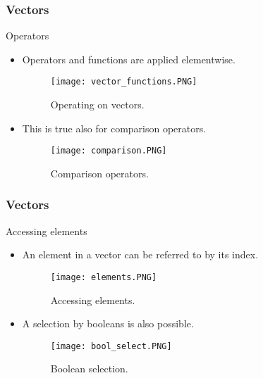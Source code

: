 \begin{frame}
    \frametitle{Vectors}
\begin{block}{Operators}
   \begin{itemize}
    \item<+->Operators and functions are applied elementwise.
     \begin{figure}[htbp]
            \centering
           \texttt{[image: vector\_functions.PNG]} 
            \caption{Operating on vectors.}
            \label{fig:vect_op}
           \end{figure}
    \item<+-> This is true also for comparison operators.
     \begin{figure}[htbp]
            \centering
           \texttt{[image: comparison.PNG]}
            \caption{Comparison operators.}
            \label{fig:vect_comp}
           \end{figure}
   \end{itemize} 
\end{block}
\end{frame}
\begin{frame}
    \frametitle{Vectors}
    \begin{block}{Accessing elements}
        \begin{itemize}
            \item<+-> An element in a vector can be referred to by its 
            index.
     \begin{figure}[htbp]
            \centering
           \texttt{[image: elements.PNG]}
            \caption{Accessing elements.}
            \label{fig:vect_elts}
           \end{figure}
           \item<+-> A selection by booleans is also possible.
           \begin{figure}[htbp]
            \centering
           \texttt{[image: bool\_select.PNG]}
            \caption{Boolean selection.}
            \label{fig:vect_bool}
           \end{figure}
        \end{itemize}
    \end{block}
\end{frame}
